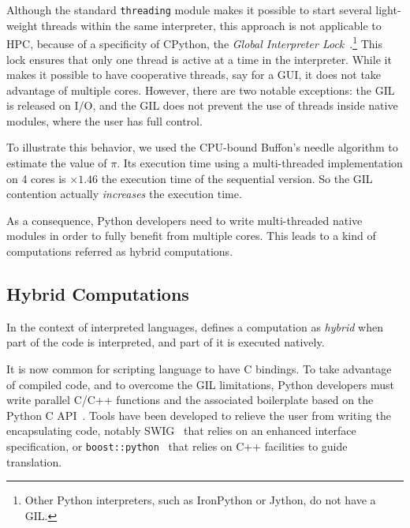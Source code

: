 \documentclass{llncs}
\begin{document}
Although the standard \texttt{threading} module makes it possible to start
several light-weight threads within the same interpreter, this approach is not
applicable to HPC, because of a specificity of CPython, the \emph{Global
Interpreter Lock}~\cite{gil2012}.\footnote{Other Python interpreters, such as
IronPython or Jython, do not have a GIL.} 
This lock ensures that only one thread
is active at a time in the interpreter. While it makes it possible to have
cooperative threads, say for a GUI, it does not take advantage of multiple
cores.  However, there are two notable exceptions: the GIL is released on I/O,
and the GIL does not prevent the use of threads inside native modules, where the
user has full control.

To illustrate this behavior, we used the CPU-bound Buffon's needle algorithm to
estimate the value of $\pi$. Its execution time using a multi-threaded
implementation on 4 cores is $\times 1.46$ the execution time of the sequential
version. So the GIL contention actually \emph{increases} the execution time.


As a consequence, Python developers need to write multi-threaded native
modules in order to fully benefit from multiple cores. This leads to a kind of
computations referred as hybrid computations.



\subsection{Hybrid Computations}

In the context of interpreted languages, \cite{dongara2007} defines a computation
as \emph{hybrid} when part of the code is interpreted, and part of it is
executed natively.

It is now common for scripting language to have C bindings. To take advantage of
compiled code, and to overcome the GIL limitations, Python developers must write
parallel C/C++ functions and the associated boilerplate based on the Python C
API~\cite{pythoncapi}. Tools have been developed to relieve the user from
writing the encapsulating code, notably SWIG~\cite{swig2003} that relies on an
enhanced interface specification, or
\texttt{boost::python}~\cite{boostpython2007} that relies on C++ facilities to
guide translation.
\end{document}
